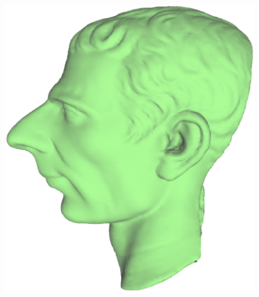 \begin{figure} [htbp]
{\begin{minipage}[b]{0.23\textwidth}
      \includegraphics[scale=0.18]{figs/f5.9.ver05-iso-1.eps}
    \end{minipage}}
\end{figure}
